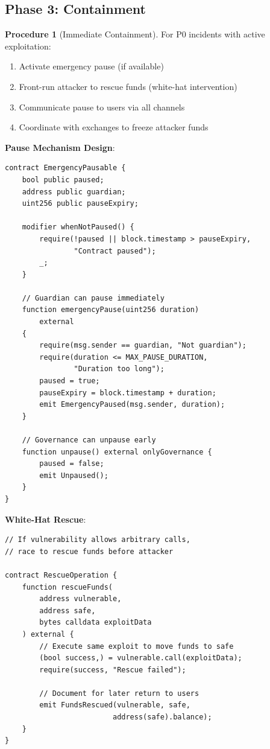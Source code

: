 \documentclass[11pt,a4paper]{article}
\theoremstyle{definition}
\newtheorem{procedure}{Procedure}
\begin{document}
\subsection{Phase 3: Containment}

\begin{procedure}[Immediate Containment]
For P0 incidents with active exploitation:
\begin{enumerate}
    \item Activate emergency pause (if available)
    \item Front-run attacker to rescue funds (white-hat intervention)
    \item Communicate pause to users via all channels
    \item Coordinate with exchanges to freeze attacker funds
\end{enumerate}
\end{procedure}

\textbf{Pause Mechanism Design}:
\begin{lstlisting}[language=Solidity,basicstyle=\ttfamily\small]
contract EmergencyPausable {
    bool public paused;
    address public guardian;
    uint256 public pauseExpiry;

    modifier whenNotPaused() {
        require(!paused || block.timestamp > pauseExpiry,
                "Contract paused");
        _;
    }

    // Guardian can pause immediately
    function emergencyPause(uint256 duration)
        external
    {
        require(msg.sender == guardian, "Not guardian");
        require(duration <= MAX_PAUSE_DURATION,
                "Duration too long");
        paused = true;
        pauseExpiry = block.timestamp + duration;
        emit EmergencyPaused(msg.sender, duration);
    }

    // Governance can unpause early
    function unpause() external onlyGovernance {
        paused = false;
        emit Unpaused();
    }
}
\end{lstlisting}

\textbf{White-Hat Rescue}:
\begin{lstlisting}[language=Solidity,basicstyle=\ttfamily\small]
// If vulnerability allows arbitrary calls,
// race to rescue funds before attacker

contract RescueOperation {
    function rescueFunds(
        address vulnerable,
        address safe,
        bytes calldata exploitData
    ) external {
        // Execute same exploit to move funds to safe
        (bool success,) = vulnerable.call(exploitData);
        require(success, "Rescue failed");

        // Document for later return to users
        emit FundsRescued(vulnerable, safe,
                         address(safe).balance);
    }
}
\end{lstlisting}
\end{document}
